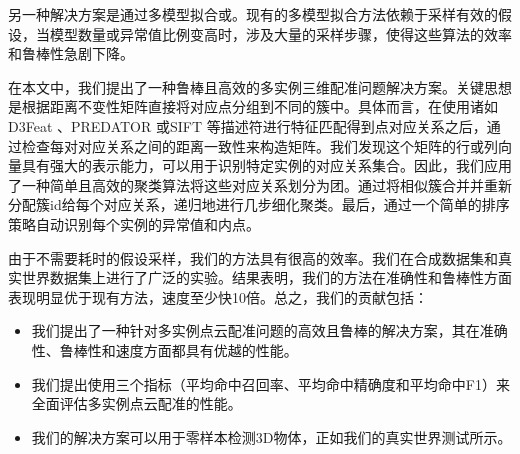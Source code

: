 另一种解决方案是通过多模型拟合\cite{Tlinkage, RPA, Coverage}或\cite{MCT, CONSAC, ProgressiveX2}。现有的多模型拟合方法依赖于采样有效的假设，当模型数量或异常值比例变高时，涉及大量的采样步骤，使得这些算法的效率和鲁棒性急剧下降。

在本文中，我们提出了一种鲁棒且高效的多实例三维配准问题解决方案。关键思想是根据距离不变性矩阵直接将对应点分组到不同的簇中。具体而言，在使用诸如D3Feat \cite{D3Feat}、PREDATOR \cite{PREDATOR}或SIFT \cite{lowe2004distinctive}等描述符进行特征匹配得到点对应关系之后，通过检查每对对应关系之间的距离一致性来构造矩阵。我们发现这个矩阵的行或列向量具有强大的表示能力，可以用于识别特定实例的对应关系集合。因此，我们应用了一种简单且高效的聚类算法将这些对应关系划分为团。通过将相似簇合并并重新分配簇id给每个对应关系，递归地进行几步细化聚类。最后，通过一个简单的排序策略自动识别每个实例的异常值和内点。



由于不需要耗时的假设采样，我们的方法具有很高的效率。我们在合成数据集和真实世界数据集上进行了广泛的实验。结果表明，我们的方法在准确性和鲁棒性方面表现明显优于现有方法，速度至少快10倍。总之，我们的贡献包括：
\begin{itemize}
\setlength{\itemsep}{-1pt}
\setlength{\parsep}{-2pt}
\item 我们提出了一种针对多实例点云配准问题的高效且鲁棒的解决方案，其在准确性、鲁棒性和速度方面都具有优越的性能。
\item 我们提出使用三个指标（平均命中召回率、平均命中精确度和平均命中F1）来全面评估多实例点云配准的性能。%
\item 我们的解决方案可以用于零样本检测3D物体，正如我们的真实世界测试所示。
\end{itemize}

